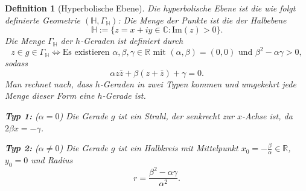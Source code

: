 \documentclass[a4paper,12pt]{article}
\theoremstyle{break}
\newtheorem{definition}{Definition}[section]
\begin{document}
\begin{definition}[Hyperbolische Ebene]
Die hyperbolische Ebene ist die wie folgt definierte Geometrie \((\mathbb{H}, \Gamma_\mathbb{H})\): Die Menge der Punkte ist die der Halbebene
\[
\mathbb{H} := \{ z = x + iy \in \mathbb{C} : \text{Im}(z) > 0 \}.
\]
Die Menge \(\Gamma_\mathbb{H}\) der \(h\)-Geraden ist definiert durch
\[
z \in g \in \Gamma_\mathbb{H} \iff \text{Es existieren } \alpha, \beta, \gamma \in \mathbb{R} \text{ mit } (\alpha, \beta) = (0, 0) \text{ und } \beta^2 - \alpha \gamma > 0,
\]
sodass
\[
\alpha z \bar{z} + \beta (z + \bar{z}) + \gamma = 0.
\]
Man rechnet nach, dass \(h\)-Geraden in zwei Typen kommen und umgekehrt jede Menge dieser Form eine \(h\)-Gerade ist. 

\textbf{Typ 1:} (\(\alpha = 0\)) Die Gerade \(g\) ist ein Strahl, der senkrecht zur \(x\)-Achse ist, da \(2\beta x = -\gamma\).

\textbf{Typ 2:} (\(\alpha \neq 0\)) Die Gerade \(g\) ist ein Halbkreis mit Mittelpunkt \(x_0 = -\frac{\beta}{\alpha} \in \mathbb{R}\), \(y_0 = 0\) und Radius
\[
r = \frac{\beta^2 - \alpha \gamma}{\alpha^2}.
\]
\end{definition}
\end{document}
